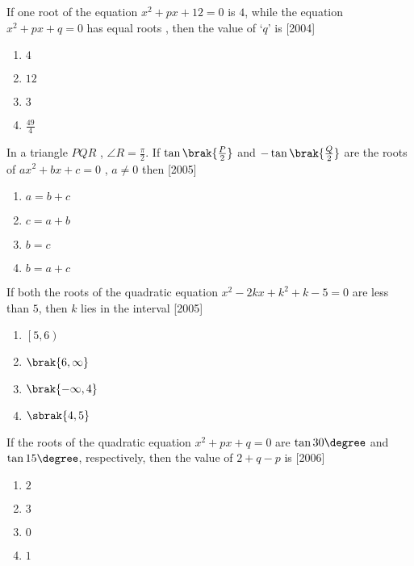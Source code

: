\item If one root of the equation $x^2 + px + 12 = 0$ is $4$, while the equation  $x^2 + px + q = 0$ has equal roots , then the value of `$q$' is
\hfill[2004]

\begin{enumerate}

	\item  $4$
	\item  $12$
	\item  $3$
	\item  $\frac{49}{4}$

\end{enumerate}

\item In a triangle $PQR$ , $\angle R = \frac{\pi}{2}$. If $ \tan\brak{\frac{P}{2}}$ and $- \tan\brak{\frac{Q}{2}}$ are the roots of $ax^2 + bx + c = 0$ , $a \neq 0$ then
\hfill[2005]

\begin{enumerate}

	\item  $a = b + c$
	\item  $c = a + b$
	\item  $b = c$
	\item  $b = a + c$

\end{enumerate}

\item If both the roots of the quadratic equation  $x^2 - 2kx + k^2 + k - 5 = 0$ are less than $5$, then $k$ lies in the interval
\hfill[2005]

\begin{enumerate}

	\item  $\left[ 5, 6 \right)$
	\item  $\brak{6,\infty}$
	\item  $\brak{- \infty,4}$
	\item  $\sbrak{4,5}$

\end{enumerate}

\item If the roots of the quadratic equation $x^2 + px + q = 0$ are $\tan 30\degree$ and $\tan 15\degree$, respectively, then the value of $2 + q - p$ is
\hfill[2006]

\begin{enumerate}


	\item  $2$
	\item  $3$
	\item  $0$
	\item  $1$
		
\end{enumerate}

